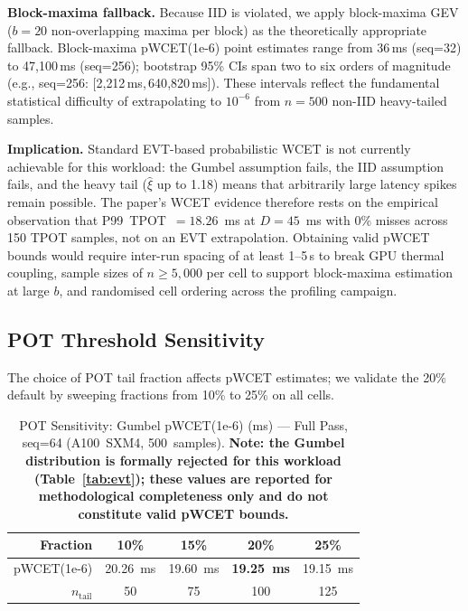 \documentclass[conference]{IEEEtran}
\begin{document}
\textbf{Block-maxima fallback.}
Because IID is violated, we apply block-maxima GEV
($b{=}20$ non-overlapping maxima per block) as the theoretically
appropriate fallback.
Block-maxima pWCET(1e-6) point estimates range from 36\,ms (seq=32)
to 47{,}100\,ms (seq=256); bootstrap 95\% CIs span two to six orders
of magnitude (e.g., seq=256: [2{,}212\,ms,\,640{,}820\,ms]).
These intervals reflect the fundamental statistical difficulty of
extrapolating to $10^{-6}$ from $n{=}500$ non-IID heavy-tailed samples.

\textbf{Implication.}
Standard EVT-based probabilistic WCET is not currently achievable
for this workload: the Gumbel assumption fails, the IID assumption
fails, and the heavy tail ($\hat{\xi}$ up to 1.18) means that
arbitrarily large latency spikes remain possible.
The paper's WCET evidence therefore rests on the empirical observation
that P99~TPOT~$=18.26$~ms at $D=45$~ms with 0\% misses across
150 TPOT samples, not on an EVT extrapolation.
Obtaining valid pWCET bounds would require inter-run spacing of at
least 1--5\,s to break GPU thermal coupling, sample sizes of
$n\geq 5{,}000$ per cell to support block-maxima estimation at
large $b$, and randomised cell ordering across the profiling campaign.

\subsection{POT Threshold Sensitivity}
\label{sec:pot}

The choice of POT tail fraction affects pWCET estimates; we validate
the 20\% default by sweeping fractions from 10\% to 25\% on all cells.

\begin{table}[htbp]
\caption{POT Sensitivity: Gumbel pWCET(1e-6) (ms) — Full Pass, seq=64
         (A100~SXM4, 500~samples). \textbf{Note: the Gumbel distribution
         is formally rejected for this workload (Table~\ref{tab:evt});
         these values are reported for methodological completeness only
         and do not constitute valid pWCET bounds.}}
\centering
\setlength{\tabcolsep}{4pt}
\begin{tabular}{@{}rcccc@{}}
\toprule
\textbf{Fraction} & 10\% & 15\% & \textbf{20\%} & 25\% \\
\midrule
pWCET(1e-6) & 20.26~ms & 19.60~ms & \textbf{19.25~ms} & 19.15~ms \\
$n_{\text{tail}}$ & 50 & 75 & 100 & 125 \\
\bottomrule
\end{tabular}
\label{tab:pot}
\end{table}
\end{document}
